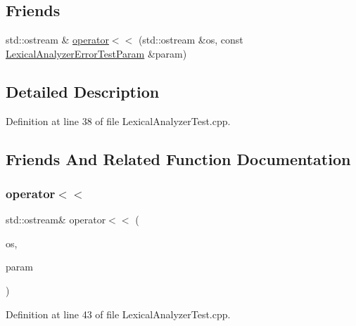 \subsection*{Friends}
\begin{DoxyCompactItemize}
\item 
std\+::ostream \& \hyperlink{struct_lexical_analyzer_error_test_param_adb9977e1fb31c903604273b3c51be7d6}{operator$<$$<$} (std\+::ostream \&os, const \hyperlink{struct_lexical_analyzer_error_test_param}{Lexical\+Analyzer\+Error\+Test\+Param} \&param)
\end{DoxyCompactItemize}


\subsection{Detailed Description}


Definition at line 38 of file Lexical\+Analyzer\+Test.\+cpp.



\subsection{Friends And Related Function Documentation}
\mbox{\label{struct_lexical_analyzer_error_test_param_adb9977e1fb31c903604273b3c51be7d6}} 
\subsubsection{\texorpdfstring{operator$<$$<$}{operator<<}}
{\footnotesize\ttfamily std\+::ostream\& operator$<$$<$ (\begin{DoxyParamCaption}\item[{std\+::ostream \&}]{os,  }\item[{const \hyperlink{struct_lexical_analyzer_error_test_param}{Lexical\+Analyzer\+Error\+Test\+Param} \&}]{param }\end{DoxyParamCaption})\hspace{0.3cm}{\ttfamily [friend]}}



Definition at line 43 of file Lexical\+Analyzer\+Test.\+cpp.




